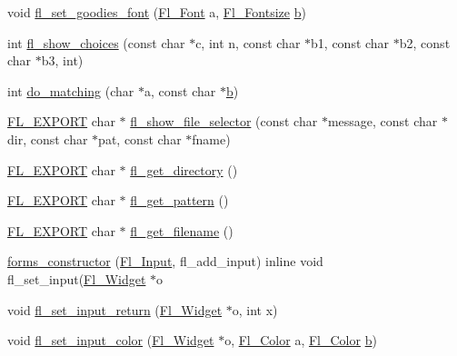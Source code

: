 \begin{DoxyCompactItemize}
\item 
void \hyperlink{forms_8_h_abc5815b645f52f175c0acdc2581e4e12}{fl\+\_\+set\+\_\+goodies\+\_\+font} (\hyperlink{_enumerations_8_h_a2ac46d9f082834b969fffe490a03a709}{Fl\+\_\+\+Font} a, \hyperlink{_enumerations_8_h_ad58927f5c691454480f7cd28362502f1}{Fl\+\_\+\+Fontsize} \hyperlink{forms_8_h_a0ba06a290a384fa06b1b90745827dae2}{b})
\item 
int \hyperlink{forms_8_h_ae3dc8cc6513663cdbde440d8afc1e45e}{fl\+\_\+show\+\_\+choices} (const char $\ast$c, int n, const char $\ast$b1, const char $\ast$b2, const char $\ast$b3, int)
\item 
int \hyperlink{forms_8_h_a7842072edc310dc3a1f0f4e3a441b97a}{do\+\_\+matching} (char $\ast$a, const char $\ast$\hyperlink{forms_8_h_a0ba06a290a384fa06b1b90745827dae2}{b})
\item 
\hyperlink{_fl___export_8_h_aa9ba29a18aee9d738370a06eeb4470fc}{F\+L\+\_\+\+E\+X\+P\+O\+RT} char $\ast$ \hyperlink{forms_8_h_a080ed20382b24b31d07903c1368e55f3}{fl\+\_\+show\+\_\+file\+\_\+selector} (const char $\ast$message, const char $\ast$dir, const char $\ast$pat, const char $\ast$fname)
\item 
\hyperlink{_fl___export_8_h_aa9ba29a18aee9d738370a06eeb4470fc}{F\+L\+\_\+\+E\+X\+P\+O\+RT} char $\ast$ \hyperlink{forms_8_h_a4d83df917ca62f1dc4a44353d8243acb}{fl\+\_\+get\+\_\+directory} ()
\item 
\hyperlink{_fl___export_8_h_aa9ba29a18aee9d738370a06eeb4470fc}{F\+L\+\_\+\+E\+X\+P\+O\+RT} char $\ast$ \hyperlink{forms_8_h_a6c2b7f1115fef0ae936847e492be3ff7}{fl\+\_\+get\+\_\+pattern} ()
\item 
\hyperlink{_fl___export_8_h_aa9ba29a18aee9d738370a06eeb4470fc}{F\+L\+\_\+\+E\+X\+P\+O\+RT} char $\ast$ \hyperlink{forms_8_h_a38bf272c4cc02a86292714beffa2341b}{fl\+\_\+get\+\_\+filename} ()
\item 
\hyperlink{forms_8_h_ad55c5b5069b077211135a0ddbbd7a3cd}{forms\+\_\+constructor} (\hyperlink{class_fl___input}{Fl\+\_\+\+Input}, fl\+\_\+add\+\_\+input) inline void fl\+\_\+set\+\_\+input(\hyperlink{class_fl___widget}{Fl\+\_\+\+Widget} $\ast$o
\item 
void \hyperlink{forms_8_h_ade80fc0eb215719f9bb957a44bca2554}{fl\+\_\+set\+\_\+input\+\_\+return} (\hyperlink{class_fl___widget}{Fl\+\_\+\+Widget} $\ast$o, int x)
\item 
void \hyperlink{forms_8_h_acc2e01462754ddf24bde1fc9a7018eca}{fl\+\_\+set\+\_\+input\+\_\+color} (\hyperlink{class_fl___widget}{Fl\+\_\+\+Widget} $\ast$o, \hyperlink{_enumerations_8_h_a8b762953646f8abee866061f1af78a6a}{Fl\+\_\+\+Color} a, \hyperlink{_enumerations_8_h_a8b762953646f8abee866061f1af78a6a}{Fl\+\_\+\+Color} \hyperlink{forms_8_h_a0ba06a290a384fa06b1b90745827dae2}{b})

\end{DoxyCompactItemize}
